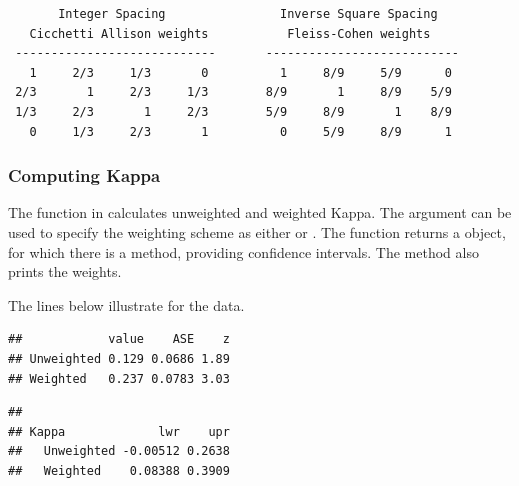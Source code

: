 \documentclass[11pt]{book}
\renewenvironment{knitrout}{\small\renewcommand{\baselinestretch}{.85}}{} %
\begin{document}
\begin{verbatim}
       Integer Spacing                Inverse Square Spacing
   Cicchetti Allison weights           Fleiss-Cohen weights
 ----------------------------       ---------------------------
   1     2/3     1/3       0          1     8/9     5/9      0
 2/3       1     2/3     1/3        8/9       1     8/9    5/9
 1/3     2/3       1     2/3        5/9     8/9       1    8/9
   0     1/3     2/3       1          0     5/9     8/9      1
\end{verbatim}

\subsubsection{Computing Kappa}

The function  in  calculates unweighted and weighted
Kappa.  The  argument can be used to specify the weighting
scheme as either  or .
The function returns a  object, for which there
is a  method, providing confidence intervals.
The  method also prints the weights.

The lines below illustrate  for the  data.
\begin{knitrout}
\color{fgcolor}\begin{kframe}
\begin{alltt}
\end{alltt}
\begin{verbatim}
##            value    ASE    z
## Unweighted 0.129 0.0686 1.89
## Weighted   0.237 0.0783 3.03
\end{verbatim}
\begin{alltt}
\hlstd{(}
\end{alltt}
\begin{verbatim}
##             
## Kappa             lwr    upr
##   Unweighted -0.00512 0.2638
##   Weighted    0.08388 0.3909
\end{verbatim}
\end{kframe}
\end{knitrout}

\end{document}
